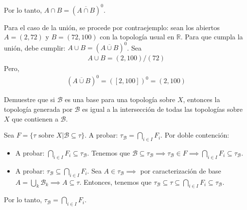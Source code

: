\begin{problema}
\begin{enumerate}
\begin{dem}
            Por lo tanto, $A\cap B=\left(\overline{A\cap B}\right)^0$.\bigbreak 
            \begin{cajita}
                Para el caso de la unión, se procede por contraejemplo: sean los abiertos $A=(2,72)$ y $B=(72,100)$ con la topología usual en $\mathbb{R}$. Para que cumpla la unión, debe cumplir: $A\cup B=\left(\overline{A\cup B}\right)^0$. Sea 
            \begin{align*}
                A\cup B = (2,100)/(72)
            \end{align*}
            Pero, 
            \begin{align*}
                \left(\overline{A\cup B}\right)^0 = \left([2,100]\right)^0 =(2,100)
            \end{align*}

            \end{cajita}
            
        \end{dem}
    \end{enumerate}


\end{problema}

\begin{problema}
    Demuestre que si $\mathcal{B}$ es una base para una topología sobre $X$, entonces la topología generada por $\mathcal{B}$ es igual a la intersección de todas las topologías sobre $X$ que contienen a $\mathcal{B}$.
    \begin{dem}
        Sea $F= \{\tau\text{ sobre } X |\mathcal{B}\subseteq \tau\}$. A probar: $\tau_\mathcal{B}=\bigcap_{i\in I} F_i$. Por doble contención: 
        \begin{itemize}
            \item A probar: $\bigcap_{i\in I} F_i\subseteq \tau_\mathcal{B}$. Tenemos que $\mathcal{B}\subseteq \tau_{\mathcal{B}}\implies \tau_{\mathcal{B}}\in F\implies \bigcap_{i\in I} F_i \subseteq \tau_\mathcal{B}$.
            \item A probar: $\tau_\mathcal{B}\subseteq \bigcap_{i\in I} F_i$. Sea $A\in \tau_\mathcal{B}\implies $ por caracterización de base $A=\bigcup_k \mathcal{B}_k\implies A\subseteq \tau$. Entonces, tenemos que $\tau_\mathcal{B}\subseteq \tau\subseteq \bigcap_{i\in I} F_i\subseteq \tau_\mathcal{B}$.
        \end{itemize}
        Por lo tanto, $\tau_\mathcal{B}=\bigcap_{i\in I} F_i$.
    \end{dem}
\end{problema}





%
%

